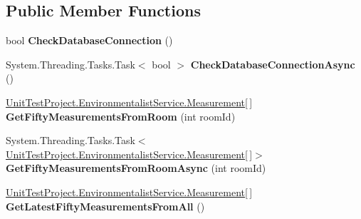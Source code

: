 \subsection*{Public Member Functions}
\begin{DoxyCompactItemize}
\item 
\hypertarget{interface_unit_test_project_1_1_environmentalist_service_1_1_i_service1_a5609ba23dd3def30d4ceeb0b9f527510}{}bool {\bfseries Check\+Database\+Connection} ()\label{interface_unit_test_project_1_1_environmentalist_service_1_1_i_service1_a5609ba23dd3def30d4ceeb0b9f527510}

\item 
\hypertarget{interface_unit_test_project_1_1_environmentalist_service_1_1_i_service1_ae89fb82ba5884b68e1c4e6900bfda68d}{}System.\+Threading.\+Tasks.\+Task$<$ bool $>$ {\bfseries Check\+Database\+Connection\+Async} ()\label{interface_unit_test_project_1_1_environmentalist_service_1_1_i_service1_ae89fb82ba5884b68e1c4e6900bfda68d}

\item 
\hypertarget{interface_unit_test_project_1_1_environmentalist_service_1_1_i_service1_a491ff5c1f6dbc6bda61b821558468dad}{}\hyperlink{class_unit_test_project_1_1_environmentalist_service_1_1_measurement}{Unit\+Test\+Project.\+Environmentalist\+Service.\+Measurement}\mbox{[}$\,$\mbox{]} {\bfseries Get\+Fifty\+Measurements\+From\+Room} (int room\+Id)\label{interface_unit_test_project_1_1_environmentalist_service_1_1_i_service1_a491ff5c1f6dbc6bda61b821558468dad}

\item 
\hypertarget{interface_unit_test_project_1_1_environmentalist_service_1_1_i_service1_aa156d6c57e01cf991de7996032759de1}{}System.\+Threading.\+Tasks.\+Task$<$ \hyperlink{class_unit_test_project_1_1_environmentalist_service_1_1_measurement}{Unit\+Test\+Project.\+Environmentalist\+Service.\+Measurement}\mbox{[}$\,$\mbox{]}$>$ {\bfseries Get\+Fifty\+Measurements\+From\+Room\+Async} (int room\+Id)\label{interface_unit_test_project_1_1_environmentalist_service_1_1_i_service1_aa156d6c57e01cf991de7996032759de1}

\item 
\hypertarget{interface_unit_test_project_1_1_environmentalist_service_1_1_i_service1_a6ce9b9cc3ccb363c585d782548ed0af5}{}\hyperlink{class_unit_test_project_1_1_environmentalist_service_1_1_measurement}{Unit\+Test\+Project.\+Environmentalist\+Service.\+Measurement}\mbox{[}$\,$\mbox{]} {\bfseries Get\+Latest\+Fifty\+Measurements\+From\+All} ()\label{interface_unit_test_project_1_1_environmentalist_service_1_1_i_service1_a6ce9b9cc3ccb363c585d782548ed0af5}


\end{DoxyCompactItemize}

